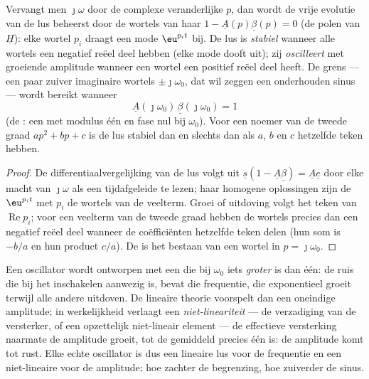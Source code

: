 \begin{theorem}\label{thm:b2:feedback-oscillators:stability}
Vervangt men $\jmath\omega$ door de complexe veranderlijke $p$, dan wordt de
vrije evolutie van de lus beheerst door de wortels van haar
\emph{}
$1 - \underline A(p)\underline\beta(p) = 0$ (de polen van $\underline H$):
elke wortel $p_i$ draagt een mode $\eu^{p_it}$ bij. De lus is \emph{stabiel}
wanneer alle wortels een negatief reëel deel hebben (elke mode dooft uit);
zij \emph{oscilleert} met groeiende amplitude wanneer een wortel een
positief reëel deel heeft. De grens --- een paar zuiver imaginaire wortels
$\pm\jmath
\omega_0$, dat wil zeggen een onderhouden sinus --- wordt bereikt
wanneer
\[
\underline A(\jmath\omega_0)\,\underline\beta(\jmath\omega_0) = 1
\]
(de \emph{}: een  met modulus één en
fase nul bij $\omega_0$). Voor een noemer van de tweede graad
$ap^2 + bp + c$ is de lus stabiel dan en slechts dan als $a$, $b$ en $c$
hetzelfde teken hebben.
\end{theorem}

\begin{proof}
De differentiaalvergelijking van de lus volgt uit
$\underline s(1 -
\underline A\underline\beta) = \underline A\underline e$
door elke macht van $\jmath\omega$ als een tijdafgeleide te lezen; haar
homogene oplossingen zijn de $\eu^{p_it}$ met $p_i$ de wortels van de
veelterm. Groei of uitdoving volgt het teken van $\operatorname{Re}p_i$;
voor een veelterm van de tweede graad hebben de wortels precies dan een
negatief reëel deel wanneer de coëfficiënten hetzelfde teken delen (hun som
is $-b/a$ en hun product $c/a$). De  is het bestaan
van een wortel in $p = \jmath\omega_0$.
\end{proof}

\begin{remark}\label{rem:b2:feedback-oscillators:start}
Een oscillator wordt ontworpen met een  die bij $\omega_0$
iets \emph{groter} is dan één: de ruis die bij het inschakelen aanwezig is,
bevat die frequentie, die exponentieel groeit terwijl alle andere uitdoven.
De lineaire theorie voorspelt dan een oneindige amplitude; in werkelijkheid
verlaagt een \emph{niet-lineariteit} --- de verzadiging van de versterker,
of een opzettelijk niet-lineair element --- de effectieve versterking
naarmate de amplitude groeit, tot de  gemiddeld precies één
is: de amplitude komt tot rust. Elke echte oscillator is dus een lineaire
lus voor de frequentie en een niet-lineaire voor de amplitude; hoe zachter
de begrenzing, hoe zuiverder de sinus.
\end{remark}

